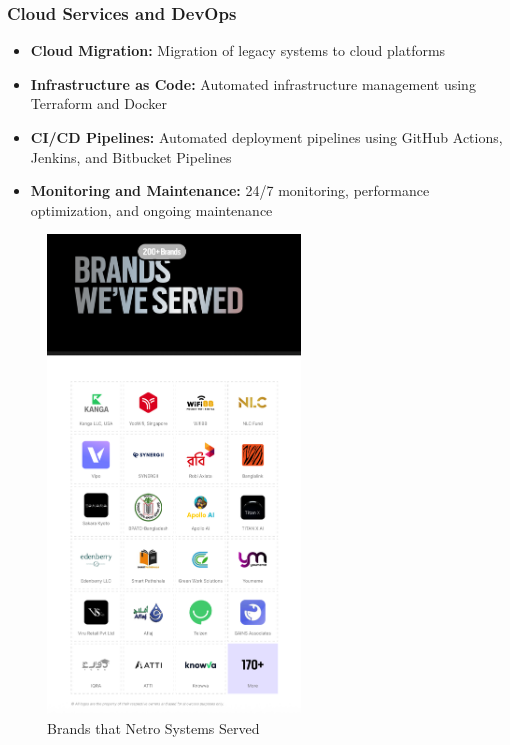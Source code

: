 \documentclass[12pt,a4paper]{report}
\newcommand{\skill}[1]{\textcolor{skillcolor}{\textbf{#1}}}
\newenvironment{coloritemize}
{\begin{itemize}[label=\textcolor{primaryblue}{$\bullet$}]}
{\end{itemize}}
\begin{document}
\subsubsection{Cloud Services and DevOps}
\begin{coloritemize}
    \item \skill{Cloud Migration:} Migration of legacy systems to cloud platforms
    \item \skill{Infrastructure as Code:} Automated infrastructure management using Terraform and Docker
    \item \skill{CI/CD Pipelines:} Automated deployment pipelines using GitHub Actions, Jenkins, and Bitbucket Pipelines
    \item \skill{Monitoring and Maintenance:} 24/7 monitoring, performance optimization, and ongoing maintenance
\end{coloritemize}
\newpage
\begin{figure}[h!]
\vspace{2cm}
\centering
    \includegraphics[width=0.6\textwidth]{Figures/served.png}
    \caption{Brands that Netro Systems Served}
\end{figure}
\end{document}
